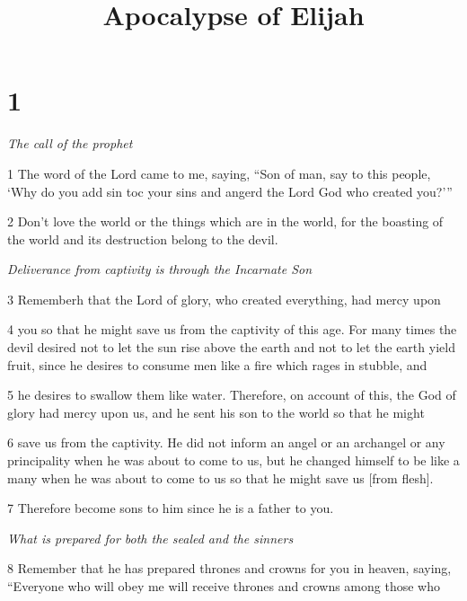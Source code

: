 

\title{Apocalypse of Elijah}

\chapter{1}

\par \textit{The call of the prophet}

\par 1 The word of the Lord came to me, saying, “Son of man, say to this people, ‘Why do you add sin toc your sins and angerd the Lord God who created you?’”

\par 2 Don't love the world or the things which are in the world, for the boasting of the world and its destruction belong to the devil.

\par \textit{Deliverance from captivity is through the Incarnate Son}

\par 3 Rememberh that the Lord of glory, who created everything, had mercy upon

\par 4 you so that he might save us from the captivity of this age. For many times the devil desired not to let the sun rise above the earth and not to let the earth yield fruit, since he desires to consume men like a fire which rages in stubble, and

\par 5 he desires to swallow them like water. Therefore, on account of this, the God of glory had mercy upon us, and he sent his son to the world so that he might

\par 6 save us from the captivity. He did not inform an angel or an archangel or any principality when he was about to come to us, but he changed himself to be like a many when he was about to come to us so that he might save us [from flesh].

\par 7 Therefore become sons to him since he is a father to you.

\par \textit{What is prepared for both the sealed and the sinners}

\par 8 Remember that he has prepared thrones and crowns for you in heaven, saying, “Everyone who will obey me will receive thrones and crowns among those who


